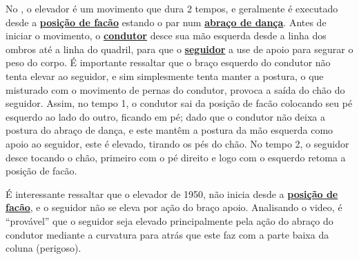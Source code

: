 No \AnoLivro, o elevador é um movimento que dura 2 tempos, e geralmente é
executado desde a \hyperref[def:facao-position]{\textbf{posição de facão}} 
estando o par num \hyperref[def:abracodedanca]{\textbf{abraço de dança}}.
Antes de iniciar o movimento, o \hyperref[def:Condutor]{\textbf{condutor}} 
desce sua mão esquerda desde a linha dos ombros até a linha do quadril, 
para que o \hyperref[def:Seguidor]{\textbf{seguidor}}
a use de apoio para segurar o peso do corpo.
É importante ressaltar que o braço esquerdo do condutor não tenta elevar ao seguidor, 
e sim simplesmente tenta manter a postura,
o que misturado com o movimento de pernas do condutor,
provoca a saída do chão do seguidor.
Assim, no tempo 1, o condutor sai da posição de facão colocando seu pé esquerdo 
ao lado do outro, ficando em pé; dado que o condutor não deixa a postura do abraço de dança,
e este mantêm a postura da mão esquerda  como apoio ao seguidor, este é elevado, tirando os pés do chão.
No tempo 2, o seguidor desce tocando o chão, primeiro com o pé direito e logo com o esquerdo retoma a posição de facão.

É interessante ressaltar que o elevador de 1950, 
não inicia desde a \hyperref[def:facao-position]{\textbf{posição de facão}}, e 
o seguidor  não se eleva por ação do braço apoio.
Analisando o video, é ``provável'' que o seguidor seja elevado principalmente pela ação do abraço do condutor
mediante a curvatura para atrás que este faz com a parte baixa da coluna (perigoso).

